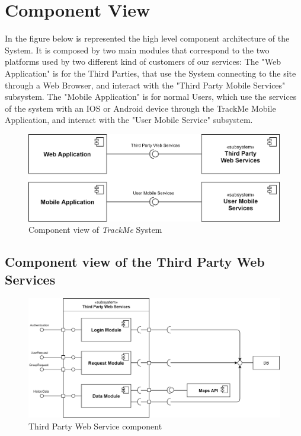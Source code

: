 \section{Component View}
In the figure below is represented the high level component architecture of the System. It is composed by two main modules that correspond to the two platforms used by two different kind of customers of our services: 
The "Web Application" is for the Third Parties, that use the System connecting to the site through a Web Browser, and interact with the "Third Party Mobile Services" subsystem. The "Mobile Application" is for normal Users, which use the services of the system with an IOS or Android device through the TrackMe Mobile Application, and interact with the "User Mobile Service" subsystem.
\newline
\newline
\newline

\begin{figure}[H]

    \centering
    \includegraphics[scale=0.25]{./Pictures/component.png}
    \caption{Component view of \emph{TrackMe} System}
    
\end{figure}

\subsection{Component view of the Third Party Web Services}
\begin{figure}[H]

    \centering
    \includegraphics[scale=0.2]{./Pictures/thirdPartyServicesDiagram.png}
    \caption{Third Party Web Service component}
    
\end{figure}
    
